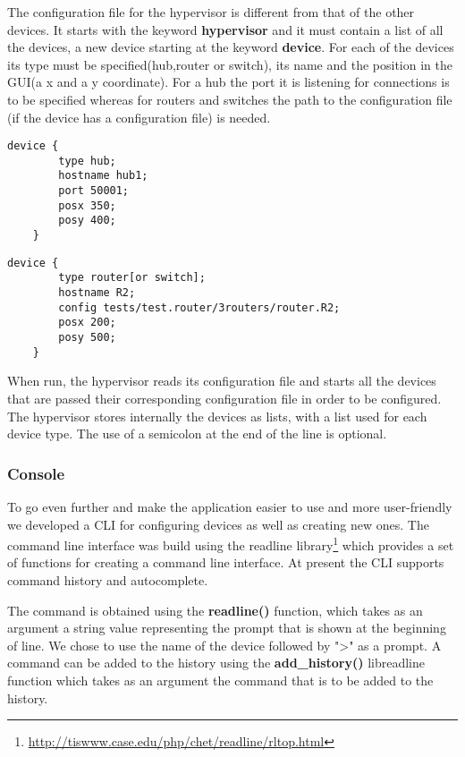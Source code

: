 {{The configuration file for the hypervisor is different from that of the other devices. It starts with the 
keyword \textbf{hypervisor} and it must contain a list of all the devices, a new device starting at the 
keyword \textbf{device}. For each of the devices its type must be specified(hub,router or switch), its 
name and the position in the GUI(a x and a y coordinate). For a hub the port it is listening for connections is 
to be specified whereas for routers and switches the path to the configuration file (if the device has a configuration file) is needed.    
\lstset{language=zsh,caption=Listing a Hub in hypervisor configuration file,label=lst:hy-config-file}
\begin{lstlisting}
device {
		type hub;
		hostname hub1;
		port 50001;
		posx 350;
		posy 400;
	}
\end{lstlisting}
\lstset{language=TeX,caption=Listing a Router/Switch in hypervisor configuration file,label=lst:hy-config-file}
\begin{lstlisting}
device {
		type router[or switch];
		hostname R2;
		config tests/test.router/3routers/router.R2;
		posx 200;
		posy 500;
	}
\end{lstlisting}
When run, the hypervisor reads its configuration file and starts all the devices that are passed their corresponding configuration file in order to be configured.
The hypervisor stores internally the devices as lists, with a list used for each device type. 
The use of a semicolon at the end of the line is optional.  
\subsubsection{Console}
\label{subsubsec:impl-console}
To go even further and make the application easier to use and more user-friendly we developed a CLI for configuring 
devices as well as creating new ones. The command line interface was build using the readline 
library\footnote{\url{http://tiswww.case.edu/php/chet/readline/rltop.html}} which provides a set of 
functions for creating a command line interface. At present the CLI supports command history and autocomplete. 

The command is obtained using the \textbf{readline()} function, which takes as an argument a string value 
representing the prompt that is shown at the beginning of line. We chose to use the name of the device followed 
by ">" as a prompt. A command can be added to the history using the \textbf{add_history()} libreadline function 
which takes as an argument the command that is to be added to the history.

}}
